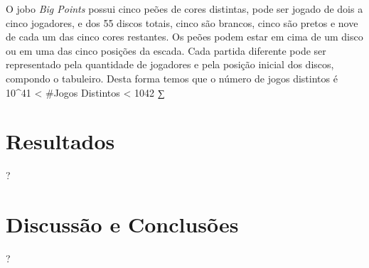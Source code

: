 \documentclass[dvipdfm, a4paper, 11pt]{article}
\begin{document}
O jobo \emph{Big Points} possui cinco peões de cores distintas, pode ser
jogado de dois a cinco jogadores, e dos 55 discos totais, cinco são
brancos, cinco são pretos e nove de cada um das cinco cores restantes.
Os peões podem estar em cima de um disco ou em uma das cinco posições da
escada. Cada partida diferente pode ser representado pela quantidade de
jogadores e pela posição inicial dos discos, compondo o tabuleiro. Desta
forma temos que o número de jogos distintos é 10\^{}41 \textless{}
\#Jogos Distintos \textless{} 1042 ∑

\section{Resultados}\label{resultados}

?

\section{Discussão e Conclusões}\label{discussuxe3o-e-conclusuxf5es}

?
\end{document}
